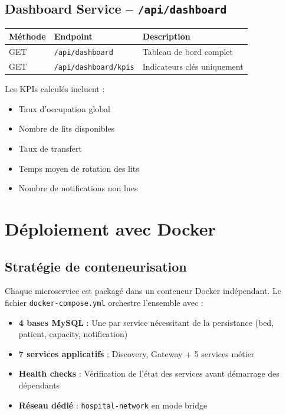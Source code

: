 \documentclass[12pt,a4paper]{report}
\begin{document}
\section{Dashboard Service -- \texttt{/api/dashboard}}

\begin{longtable}{llp{7cm}}
    \toprule
    \textbf{M\'ethode} & \textbf{Endpoint} & \textbf{Description} \\
    \midrule
    \endhead
    GET & \texttt{/api/dashboard} & Tableau de bord complet \\
    GET & \texttt{/api/dashboard/kpis} & Indicateurs cl\'es uniquement \\
    \bottomrule
\end{longtable}

Les KPIs calcul\'es incluent :
\begin{itemize}
    \item Taux d'occupation global
    \item Nombre de lits disponibles
    \item Taux de transfert
    \item Temps moyen de rotation des lits
    \item Nombre de notifications non lues
\end{itemize}

\chapter{D\'eploiement avec Docker}

\section{Strat\'egie de conteneurisation}

Chaque microservice est packag\'e dans un conteneur Docker ind\'ependant. Le fichier \texttt{docker-compose.yml} orchestre l'ensemble avec :

\begin{itemize}
    \item \textbf{4 bases MySQL} : Une par service n\'ecessitant de la persistance (bed, patient, capacity, notification)
    \item \textbf{7 services applicatifs} : Discovery, Gateway + 5 services m\'etier
    \item \textbf{Health checks} : V\'erification de l'\'etat des services avant d\'emarrage des d\'ependants
    \item \textbf{R\'eseau d\'edi\'e} : \texttt{hospital-network} en mode bridge
\end{itemize}
\end{document}
